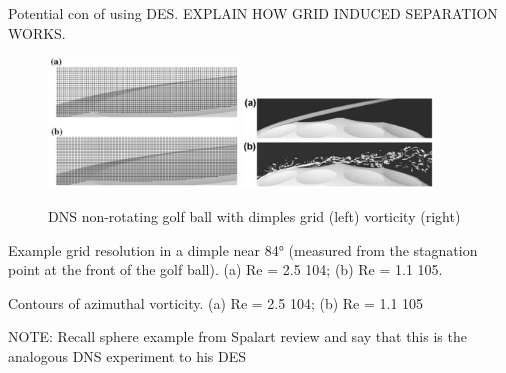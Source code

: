 \documentclass[journal]{new-aiaa}
\begin{document}
Potential con of using DES. EXPLAIN HOW GRID INDUCED SEPARATION WORKS.







\begin{figure}[H]
\begin{center}
\includegraphics[width=0.45\textwidth]{Images/logan/smith2010numerical_golfballgrid.pdf}
\includegraphics[width=0.45\textwidth]{Images/logan/smith2010numerical_golfballvorticity.pdf}
\caption{ DNS non-rotating golf ball with dimples grid (left) vorticity (right) \cite{smith2010numerical} }
\label{fig:dnsgolfball}
\end{center}
\end{figure}


Example grid resolution in a dimple near 84° (measured from the stagnation point at the front of the golf ball). (a) Re = 2.5   104; (b) Re = 1.1   105.

Contours of azimuthal vorticity. (a) Re = 2.5   104; (b) Re = 1.1   105

NOTE: Recall sphere example from Spalart review and say that this is the analogous DNS experiment to his DES
\end{document}
